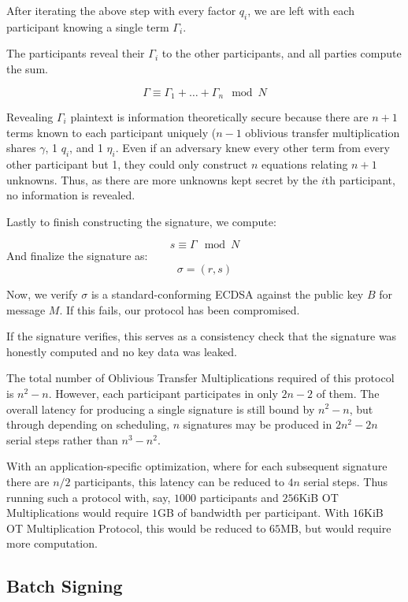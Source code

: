 \documentclass{article}
\begin{document}
After iterating the above step with every factor $q_i$, we are left with each participant knowing a single term $\Gamma_i$. 

The participants reveal their $\Gamma_i$ to the other participants, and all parties compute the sum.

$$\Gamma \equiv \Gamma_1 + \ldots + \Gamma_n \mod N$$

Revealing $\Gamma_i$ plaintext is information theoretically secure because there are $n+1$ terms known to each participant uniquely ($n-1$ oblivious transfer multiplication shares $\gamma$, 1 $q_i$, and 1 $\eta_i$. Even if an adversary knew every other term from every other participant but 1, they could only construct  $n$ equations relating $n+1$ unknowns. Thus, as there are more unknowns kept secret by the $i$th participant, no information is revealed.


Lastly to finish constructing the signature, we compute:

$$s \equiv \Gamma \mod N$$ 
And finalize the signature as:
$$\sigma = (r, s)$$



Now, we verify $\sigma$ is a standard-conforming ECDSA against the public key
$B$ for message $M$. If this fails, our protocol has been compromised.

If the signature verifies, this serves as a consistency check that the signature was honestly computed and no key data was leaked.

The total number of Oblivious Transfer Multiplications required of this protocol is $n^2 - n$. However, each participant participates in only $2n-2$ of them. The overall latency for producing a single signature is still bound by $n^2 -n$, but through depending on scheduling, $n$ signatures may be produced in $2n^2 - 2n$ serial steps rather than
$n^3 - n^2$.

With an application-specific optimization, where for each subsequent signature there are $n/2$ participants, this latency can be reduced to $4n$ serial steps. Thus running such a protocol with, say, $1000$ participants and $256$KiB OT Multiplications would require $1$GB of bandwidth per participant. With $16$KiB OT Multiplication Protocol, this would be reduced to $65$MB, but would require more computation.




\subsection{Batch Signing}
\end{document}
